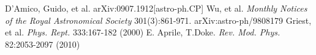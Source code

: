 \documentclass[a4paper,12pt]{article}
\begin{document}
\begin{thebibliography}{1}
 D'Amico, Guido, et al. arXiv:0907.1912[astro-ph.CP] 
 Wu, et al.  \emph{Monthly Notices of the Royal Astronomical Society} 301(3):861-971.  arXiv:astro-ph/9808179
 Griest, et al.  \emph{Phys. Rept.} 333:167-182 (2000) 
 E. Aprile, T.Doke. \emph{Rev. Mod. Phys.} 82:2053-2097 (2010)


\end{thebibliography}
\end{document}
